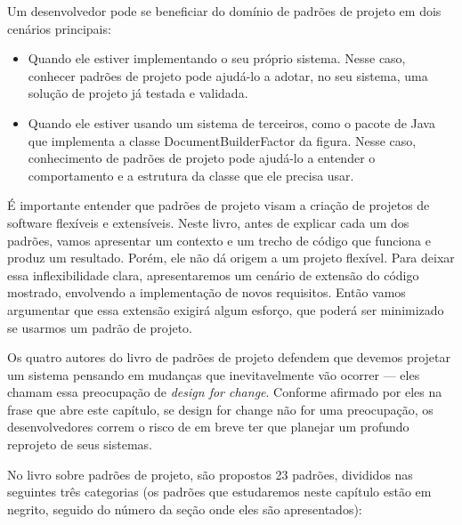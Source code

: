 \documentclass[
  11pt,
  twoside]{book}
\begin{document}
Um desenvolvedor pode se beneficiar do domínio de padrões de projeto em
dois cenários principais:

\begin{itemize}
\item
  Quando ele estiver implementando o seu próprio sistema. Nesse caso,
  conhecer padrões de projeto pode ajudá-lo a adotar, no seu sistema,
  uma solução de projeto já testada e validada.
\item
  Quando ele estiver usando um sistema de terceiros, como o pacote de
  Java que implementa a classe DocumentBuilderFactor da figura. Nesse
  caso, conhecimento de padrões de projeto pode ajudá-lo a entender o
  comportamento e a estrutura da classe que ele precisa usar.
\end{itemize}

É importante entender que padrões de projeto visam a criação de projetos
de software flexíveis e extensíveis. Neste livro, antes de explicar cada
um dos padrões, vamos apresentar um contexto e um trecho de código que
funciona e produz um resultado. Porém, ele não dá origem a um projeto
flexível. Para deixar essa inflexibilidade clara, apresentaremos um
cenário de extensão do código mostrado, envolvendo a implementação de
novos requisitos. Então vamos argumentar que essa extensão exigirá algum
esforço, que poderá ser minimizado se usarmos um padrão de projeto.

 Os quatro autores do livro de padrões de
projeto defendem que devemos projetar um sistema pensando em mudanças
que inevitavelmente vão ocorrer --- eles chamam essa preocupação de
\emph{design for change}. Conforme afirmado por eles na frase que abre
este capítulo, se design for change não for uma preocupação, os
desenvolvedores correm o risco de em breve ter que planejar um profundo
reprojeto de seus sistemas.

No livro sobre padrões de projeto, são propostos 23 padrões, divididos
nas seguintes três categorias (os padrões que estudaremos neste capítulo
estão em negrito, seguido do número da seção onde eles são
apresentados):
\end{document}
